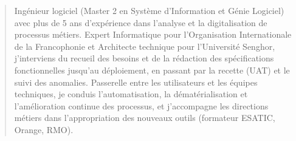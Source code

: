 \documentclass[10pt,a4paper,ragged2e,withhyper]{altacv}
\begin{document}


    \makecvheader

    \begin{quote}
    \normalsize Ingénieur logiciel (Master 2 en Système d'Information et Génie Logiciel) avec plus de 5 ans d'expérience dans l'analyse et la digitalisation de processus métiers. Expert Informatique pour l'Organisation Internationale de la Francophonie et Architecte technique pour l'Université Senghor, j'interviens du recueil des besoins et de la rédaction des spécifications fonctionnelles jusqu'au déploiement, en passant par la recette (UAT) et le suivi des anomalies. Passerelle entre les utilisateurs et les équipes techniques, je conduis l'automatisation, la dématérialisation et l'amélioration continue des processus, et j'accompagne les directions métiers dans l'appropriation des nouveaux outils (formateur ESATIC, Orange, RMO).
    \end{quote}
    \vspace{-0.5em}

\end{document}
